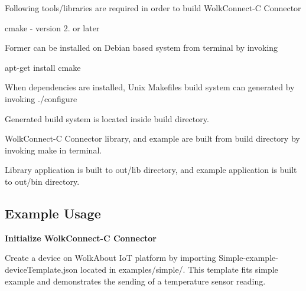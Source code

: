Following tools/libraries are required in order to build Wolk\+Connect-\/C Connector


\begin{DoxyItemize}
\item cmake -\/ version 2. or later
\end{DoxyItemize}

Former can be installed on Debian based system from terminal by invoking

{\ttfamily apt-\/get install cmake}

When dependencies are installed, Unix Makefiles build system can generated by invoking {\ttfamily ./configure}

Generated build system is located inside {\ttfamily build} directory.

Wolk\+Connect-\/C Connector library, and example are built from {\ttfamily build} directory by invoking {\ttfamily make} in terminal.

Library application is built to {\ttfamily out/lib} directory, and example application is built to {\ttfamily out/bin} directory.

\subsection*{Example Usage }

{\bfseries Initialize Wolk\+Connect-\/C Connector}

Create a device on Wolk\+About IoT platform by importing {\ttfamily Simple-\/example-\/device\+Template.\+json} located in {\ttfamily examples/simple/}. This template fits {\ttfamily simple} example and demonstrates the sending of a temperature sensor reading.


